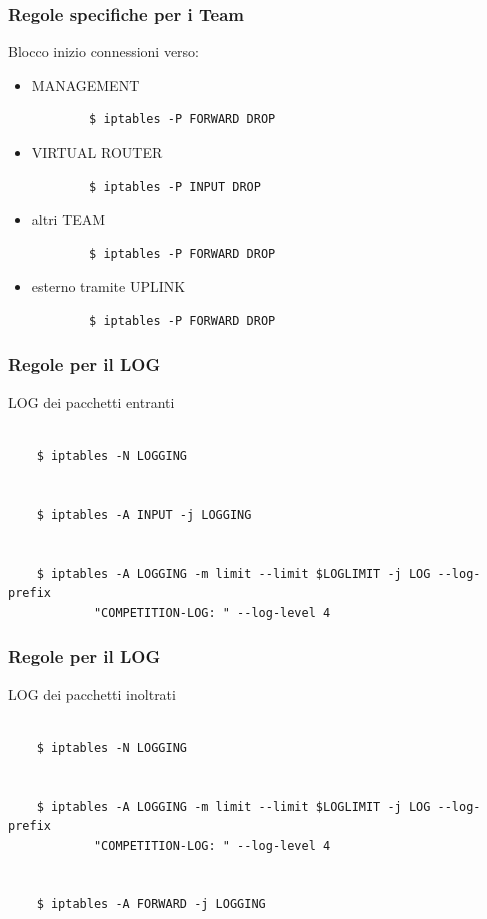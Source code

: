 \documentclass{beamer}
\begin{document}
\begin{frame}[fragile]
    \frametitle{Regole specifiche per i Team}
    Blocco inizio connessioni verso:
    \begin{itemize}
        \item MANAGEMENT
            \begin{lstlisting}
        $ iptables -P FORWARD DROP
            \end{lstlisting}
        \item VIRTUAL ROUTER
            \begin{lstlisting}
        $ iptables -P INPUT DROP  
            \end{lstlisting}
        \item altri TEAM
            \begin{lstlisting}
        $ iptables -P FORWARD DROP
            \end{lstlisting}
        \item esterno tramite UPLINK
            \begin{lstlisting}
        $ iptables -P FORWARD DROP
            \end{lstlisting}
    \end{itemize}
\end{frame}

\begin{frame}[fragile]
    \frametitle{Regole per il LOG}
    LOG dei pacchetti entranti
    \\~\\
    \begin{lstlisting}
    $ iptables -N LOGGING
    
    
    $ iptables -A INPUT -j LOGGING
    
    
    $ iptables -A LOGGING -m limit --limit $LOGLIMIT -j LOG --log-prefix 
            "COMPETITION-LOG: " --log-level 4

    \end{lstlisting}

\end{frame}


\begin{frame}[fragile]
    \frametitle{Regole per il LOG}
    LOG dei pacchetti inoltrati
    \\~\\
    \begin{lstlisting}
    $ iptables -N LOGGING


    $ iptables -A LOGGING -m limit --limit $LOGLIMIT -j LOG --log-prefix 
            "COMPETITION-LOG: " --log-level 4
    
    
    $ iptables -A FORWARD -j LOGGING
    \end{lstlisting}

\end{frame}
\end{document}
